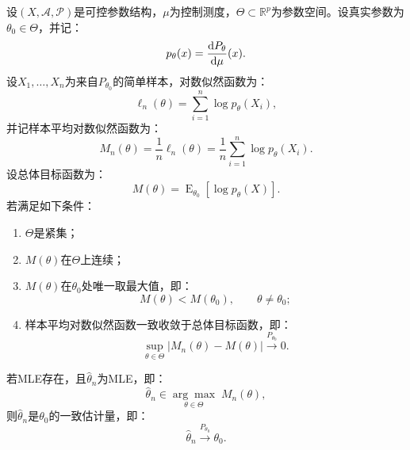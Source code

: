 \begin{property}\label{prop:MLEConsistency}
	设$(X,\mathscr{A},\mathscr{P})$是可控参数结构，$\mu$为控制测度，$\Theta\subset\mathbb{R}^p$为参数空间。设真实参数为$\theta_0\in\Theta$，并记：
	\begin{equation*}
		p_\theta(x)=\frac{\mathop{}\!\mathrm{d} P_\theta}{\mathop{}\!\mathrm{d}\mu}(x).
	\end{equation*}
	设$X_1,\ldots,X_n$为来自$P_{\theta_0}$的简单样本，对数似然函数为：
	\begin{equation*}
		\ell_n(\theta)
		=
		\sum_{i=1}^{n}\log p_\theta(X_i),
	\end{equation*}
	并记样本平均对数似然函数为：
	\begin{equation*}
		M_n(\theta)
		=
		\frac{1}{n}\ell_n(\theta)
		=
		\frac{1}{n}\sum_{i=1}^{n}\log p_\theta(X_i).
	\end{equation*}
	设总体目标函数为：
	\begin{equation*}
		M(\theta)
		=
		\operatorname{E}_{\theta_0}[\log p_\theta(X)].
	\end{equation*}
	若满足如下条件：
	\begin{enumerate}
		\item $\Theta$是紧集；
		\item $M(\theta)$在$\Theta$上连续；
		\item $M(\theta)$在$\theta_0$处唯一取最大值，即：
		\begin{equation*}
			M(\theta)<M(\theta_0),\qquad \theta\neq\theta_0;
		\end{equation*}
		\item 样本平均对数似然函数一致收敛于总体目标函数，即：
		\begin{equation*}
			\sup_{\theta\in\Theta}
			\left|
			M_n(\theta)-M(\theta)
			\right|
			\xrightarrow{P_{\theta_0}}0.
		\end{equation*}
	\end{enumerate}
	若MLE存在，且$\hat{\theta}_n$为MLE，即：
	\begin{equation*}
		\hat{\theta}_n
		\in
		\underset{\theta\in\Theta}{\arg\max}\;M_n(\theta),
	\end{equation*}
	则$\hat{\theta}_n$是$\theta_0$的一致估计量，即：
	\begin{equation*}
		\hat{\theta}_n\xrightarrow{P_{\theta_0}}\theta_0.
	\end{equation*}
\end{property}

